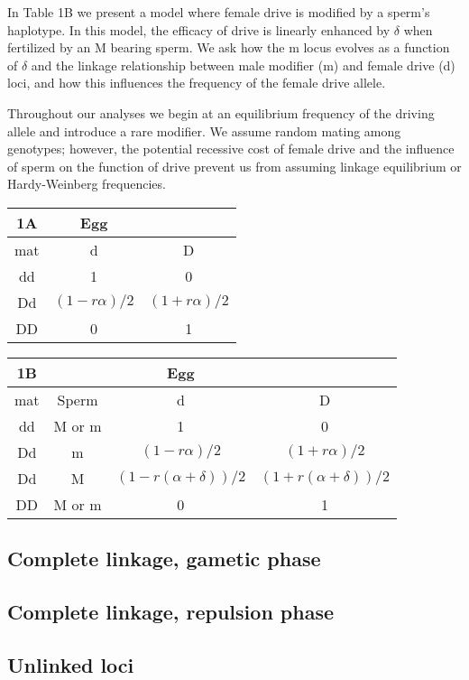 \documentclass[12pt,letterpaper]{article}
\begin{document}
In Table 1B we present a model where female drive is modified by a sperm's haplotype. 
In this model, the efficacy of drive is linearly enhanced by $\delta$ when fertilized by an M bearing sperm. 
We ask how the m locus evolves as a function of $\delta$ and the linkage relationship between male modifier (m) and female drive (d) loci, and how this influences the frequency of the female drive allele.

Throughout our analyses we begin at an equilibrium frequency of the driving allele and introduce a rare modifier.
We assume random mating among genotypes; however, the potential recessive cost of female drive and the influence of sperm on the function of drive prevent us from assuming linkage equilibrium or Hardy-Weinberg frequencies. 

\begin{table}[ht]
\begin{center}
\begin{tabular}{ccc}
  \hline
1A  & Egg \\   \hline
mat 	& 		d 			& 		D 	\\  \hline
dd		& 		1		&		0	\\
Dd		& $(1-r \alpha)/2$	&	 $(1+r \alpha)/2$ 	\\
DD		& 		0			&		1	\\
   \hline
\end{tabular}
\end{center}
\end{table}

\begin{table}[ht]
\begin{center}
\begin{tabular}{cccc}
  \hline
1B  		& 			& Egg \\   \hline
mat 	& Sperm	&		d 					& 		D 	\\  \hline
dd		& M	 or m	&	1						&		0	\\
Dd		& m			&$(1-r \alpha)/2$			&	 $(1+r \alpha)/2$ 	\\
Dd		& M			&$(1-r (\alpha +\delta))/2$	&	 $(1+r( \alpha+\delta))/2$ 	\\
DD		& M	 or m	&0							&		1	\\
   \hline
\end{tabular}
\end{center}
\end{table}


\subsection*{Complete linkage, gametic phase }


\subsection*{Complete linkage, repulsion phase }

\subsection*{Unlinked loci}
\end{document}
